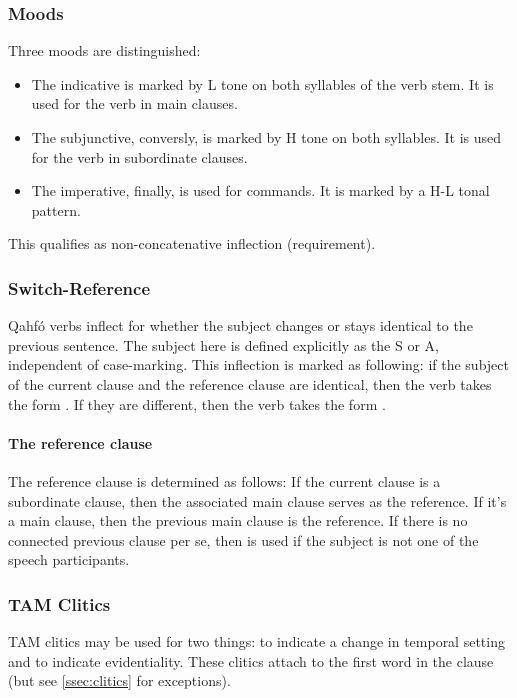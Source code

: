 \documentclass{article}
\newcommand{\con}[1]{\hspace{0pt}{\color{olive}#1}}
\newcommand{\langname}{Qahfó}
\begin{document}
\subsubsection{Moods}
Three moods are distinguished:
\begin{itemize}
\item The indicative is marked by L tone on both syllables of the verb stem. It is used for the verb in main clauses.
\item The subjunctive, conversly, is marked by H tone on both syllables. It is used for the verb in subordinate clauses.
\item The imperative, finally, is used for commands. It is marked by a H-L tonal pattern.
\end{itemize}

This qualifies as non-concatenative inflection (requirement).


\subsubsection{Switch-Reference}
\langname{} verbs inflect for whether the subject changes or stays identical to the previous sentence. The subject here is defined explicitly as the S or A, independent of case-marking. This inflection is marked as following: if the subject of the current clause and the reference clause are identical, then the verb takes the form \con{S1-∅}. If they are different, then the verb takes the form \con{S2-llu (-llú-)}.

\paragraph{The reference clause} The reference clause is determined as follows: If the current clause is a subordinate clause, then the associated main clause serves as the reference. If it’s a main clause, then the previous main clause is the reference. If there is no connected previous clause per se, then \con{-llu} is used if the subject is not one of the speech participants.

\subsubsection{TAM Clitics} \label{ssec:tamclitics}

TAM clitics may be used for two things: to indicate a change in temporal setting and to indicate evidentiality. These clitics attach to the first word in the clause (but see \ref{ssec:clitics} for exceptions).
\end{document}
